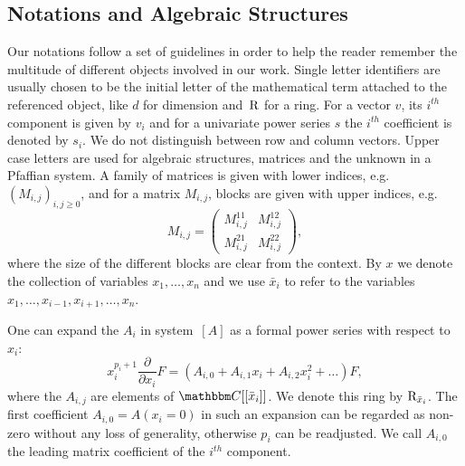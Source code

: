 \documentclass[final,1p,times,number,amsthm]{elsart}
\let\set\mathbbm
\newcommand{\pder}[2]{\frac{\partial}{\partial #2}#1}
\begin{document}
\subsection{Notations and Algebraic Structures}
Our notations follow a set of guidelines in order to help the reader remember
the multitude of different objects involved in our work. Single letter
identifiers are usually chosen to be the initial letter of the mathematical term
attached to the referenced object, like $d$ for dimension and~$\rm R$ for a
ring. For a vector $v$, its $i^{th}$ component is given by $v_i$ and for a
univariate power series $s$ the $i^{th}$ coefficient is denoted by $s_i$. We do
not distinguish between row and column vectors. Upper case letters are used for
algebraic structures, matrices and the unknown in a Pfaffian system. A family of
matrices is given with lower indices, e.g.\ $(M_{i,j})_{i,j\geq 0}$, and for a
matrix $M_{i,j}$, blocks are given with upper indices, e.g.
\[
M_{i,j}=\left(\begin{matrix}
    M_{i,j}^{11} & M_{i,j}^{12}\\
    M_{i,j}^{21} & M_{i,j}^{22}
  \end{matrix}\right),
\]
where the size of the different blocks are clear from the context.
By $x$ we denote the collection of variables $x_1,\dots,x_n$ and we use
$\bar{x}_i$ to refer to the variables
$x_1,\dots,x_{i-1},x_{i+1},\dots,x_n$.

One can expand the $A_i$ in system~$[A]$ as a formal power series with respect
to $x_i$:
\begin{equation*}
  x_i^{p_i +1 }\pder{F}{x_i} = (A_{i,0}+ A_{i,1} x_i +
  A_{i,2} x_i^2 + \dots ) F,
\end{equation*}
where the $A_{i,j}$ are elements of $\set C[[\bar{x}_i]]$. We denote this ring
by ${\rm R}_{\bar{x}_i}$.  The first coefficient $A_{i,0} = A(x_i=0)$ in such an
expansion can be regarded as non-zero without any loss of generality, otherwise
$p_i$ can be readjusted. We call $A_{i,0}$ the leading matrix coefficient of the
$i^{th}$ component.
\end{document}
